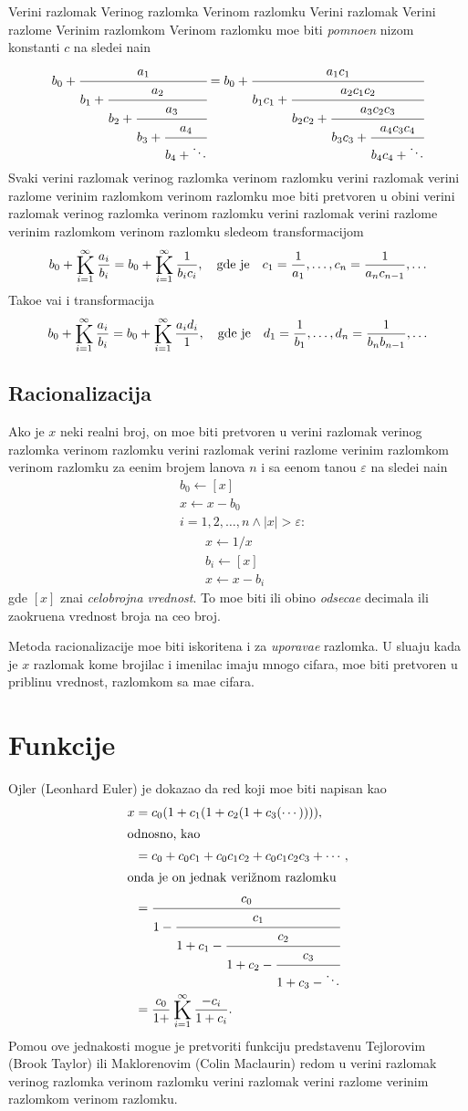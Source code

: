 \documentclass[12pt, twoside, a4paper]{article}
\def\vr#1{\ifcase#1\relax\or
  ve\-ri{\zv}\-ni raz\-lo\-mak\or
  ve\-ri{\zv}\-nog raz\-lom\-ka\or
  ve\-ri{\zv}\-nom raz\-lom\-ku\or
  ve\-ri{\zv}\-ni raz\-lo\-mak\or
  ve\-ri{\zv}\-ni raz\-lom\-{\cv}e\or
  ve\-ri{\zv}\-nim raz\-lom\-kom\or
  ve\-ri{\zv}\-nom raz\-lom\-ku\fi}
\def\Vr#1{\ifcase#1\relax\or
  Ve\-ri{\zv}\-ni raz\-lo\-mak\or
  Ve\-ri{\zv}\-nog raz\-lom\-ka\or
  Ve\-ri{\zv}\-nom raz\-lom\-ku\or
  Ve\-ri{\zv}\-ni raz\-lo\-mak\or
  Ve\-ri{\zv}\-ni raz\-lom\-{\cv}e\or
  Ve\-ri{\zv}\-nim raz\-lom\-kom\or
  Ve\-ri{\zv}\-nom raz\-lom\-ku\fi}
\begin{document}
\Vr1 mo{\zv}e biti {\sl pomno{\zv}en\/} nizom konstanti $c$ na slede{\cc}i na{\cv}in
$$
b_0+\cfrac{a_1}{b_1+\cfrac{a_2}{b_2+\cfrac{a_3}{b_3+\cfrac{a_4}{b_4+\ddots}}}}
=
b_0+\cfrac{a_1c_1}{b_1c_1+\cfrac{a_2c_1c_2}{b_2c_2+\cfrac{a_3c_2c_3}{b_3c_3+\cfrac{a_4c_3c_4}{b_4c_4+\ddots}}}}
$$
Svaki \vr1 mo{\zv}e biti pretvoren u obi{\cv}ni \vr1 slede{\cc}om transformacijom
$$
b_0+\Kinf{a_i}{b_i} 
= 
b_0+\Kinf1{b_ic_i}, \quad\text{gde je}\quad
c_1={1\over a_1}, \ldots, 
c_n={1\over a_n c_{n-1}}, \ldots
$$
Tako{\dj}e va{\zv}i i transformacija
$$
b_0+\Kinf{a_i}{b_i} 
= 
b_0+\Kinf{a_i d_i}1, \quad\text{gde je}\quad
d_1={1\over b_1}, \ldots, 
d_n={1\over b_n b_{n-1}}, \ldots
$$

\subsection{Racionalizacija}

Ako je $x$ neki realni broj, on mo{\zv}e biti pretvoren u \vr1
za {\zv}e{\lj}enim brojem {\cv}lanova $n$ i
sa {\zv}e{\lj}enom
ta{\cv}no{\sv}{\cc}u $\varepsilon$ na slede{\cc}i na{\cv}in
\begin{align*}
&b_0\leftarrow[x]\\
&x\leftarrow x-b_0\\
&i=1,2,\ldots,n\land |x|>\varepsilon:\\
&\qquad x\leftarrow 1/x\\
&\qquad b_i\leftarrow[x]\\
&\qquad x\leftarrow x-b_i
\end{align*}
gde $[x]$ zna{\cv}i {\sl celobrojna vrednost}. To mo{\zv}e biti ili obi{\cv}no {\sl odseca{\nj}e\/} decimala
ili zaokru{\zv}ena vrednost broja na ceo broj.

Metoda racionalizacije mo{\zv}e biti iskori{\sv}tena i za {\sl upor{\sv}{\cc}ava{\nj}e\/} razlomka.
U slu{\cv}aju kada je $x$ razlomak kome
brojilac i imenilac imaju mnogo cifara, mo{\zv}e biti pretvoren u pribli{\zv}nu vrednost, 
razlomkom sa ma{\nj}e cifara.


\section{Funkcije}

Ojler (Leonhard Euler) je dokazao da red koji mo{\zv}e biti napisan kao
\begin{align*}
x & =c_0(1+c_1(1+c_2(1+c_3(\cdots)))),\\
\intertext{odnosno, kao}
&=c_0+c_0c_1+c_0c_1c_2+c_0c_1c_2c_3+\cdots,\\
\intertext{onda je on jednak \vr3}
&=\cfrac{c_0}{1-\cfrac{c_1}{1+c_1-\cfrac{c_2}{1+c_2-\cfrac{c_3}{1+c_3-\ddots}}}}\\
&={c_0\over1+}\Kinf{-c_i}{1+c_i}.
\end{align*}
Pomo{\cc}u ove jednakosti mogu{\cc}e je pretvoriti funkciju predstav{\lj}enu
Tejlorovim (Brook Taylor) ili 
Maklorenovim (Colin Maclaurin) redom u \vr1.
\end{document}
